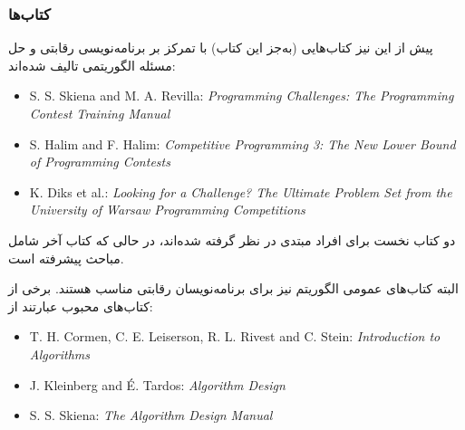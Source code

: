 \subsubsection{کتاب‌ها}

پیش از این نیز کتاب‌هایی (به‌جز این کتاب) با تمرکز بر برنامه‌نویسی رقابتی و حل مسئله الگوریتمی تالیف شده‌اند:

\begin{itemize}
\item S. S. Skiena and M. A. Revilla:
\emph{Programming Challenges: The Programming Contest Training Manual} \cite{ski03}
\item S. Halim and F. Halim:
\emph{Competitive Programming 3: The New Lower Bound of Programming Contests} \cite{hal13}
\item K. Diks et al.: \emph{Looking for a Challenge? The Ultimate Problem Set from
the University of Warsaw Programming Competitions} \cite{dik12}
\end{itemize}

دو کتاب نخست برای افراد مبتدی در نظر گرفته شده‌اند، در حالی که کتاب آخر شامل مباحث پیشرفته است.

البته کتاب‌های عمومی الگوریتم نیز برای برنامه‌نویسان رقابتی مناسب هستند.
برخی از کتاب‌های محبوب عبارتند از:

\begin{itemize}
\item T. H. Cormen, C. E. Leiserson, R. L. Rivest and C. Stein:
\emph{Introduction to Algorithms} \cite{cor09}
\item J. Kleinberg and É. Tardos:
\emph{Algorithm Design} \cite{kle05}
\item S. S. Skiena:
\emph{The Algorithm Design Manual} \cite{ski08}
\end{itemize}